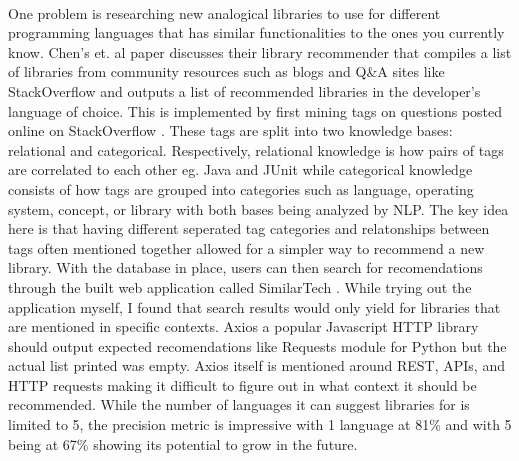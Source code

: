 \documentclass[12pt]{article}
\begin{document}
\paragraph{}
One problem is researching new analogical libraries to use for different programming languages that has similar functionalities 
to the ones you currently know. Chen's et. al \cite{analogical} paper discusses their library recommender 
that compiles a list of libraries from community resources such as blogs and Q\&A sites like StackOverflow \cite{stackoverflow} 
and outputs a list of recommended libraries in the developer's language of choice. 
This is implemented by first mining tags on questions posted online on StackOverflow \cite{stackoverflow}.
These tags are split into two knowledge bases: relational and categorical. Respectively, relational knowledge is how pairs of
tags are correlated to each other eg. Java and JUnit while categorical knowledge consists of how tags are grouped into categories such as 
language, operating system, concept, or library with both bases being analyzed by NLP. 
The key idea here is that having different seperated tag categories and relatonships between tags often mentioned together
allowed for a simpler way to recommend a new library. With the database in place, users can then search for recomendations through the built
web application called SimilarTech \cite{similartech}.
While trying out the application myself, I found that search results would only yield for 
libraries that are mentioned in specific contexts.
Axios \cite{axios} a popular Javascript HTTP library should output expected 
recomendations like Requests \cite{requests} module for Python but the actual list printed was empty.
Axios \cite{axios} itself is mentioned around REST, APIs, and HTTP requests making it difficult to figure out in what context it should be recommended.
While the number of languages it can suggest libraries for is limited to 5, the precision metric is impressive
with 1 language at 81\% and with 5 being at 67\% showing its potential to grow in the future.
\end{document}
